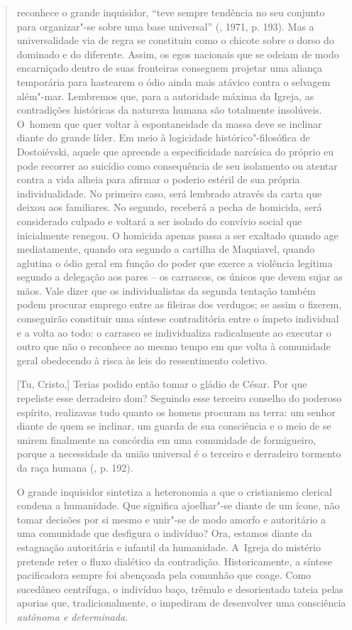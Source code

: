 {\begin{quote}
reconhece o grande inquisidor, ``teve sempre tendência no seu conjunto
para organizar"-se sobre uma base universal'' (, 1971, p.
193). Mas a universalidade via de regra se constituiu como o chicote
sobre o dorso do dominado e do diferente. Assim, os egos nacionais que
se odeiam de modo encarniçado dentro de suas fronteiras conseguem
projetar uma aliança temporária para hastearem o ódio ainda mais atávico
contra o selvagem além"-mar. Lembremos que, para a autoridade máxima da
Igreja, as contradições históricas da natureza humana são totalmente
insolúveis. O~homem que quer voltar à espontaneidade da massa deve se
inclinar diante do grande líder. Em meio à logicidade
histórico"-filosófica de Dostoiévski, aquele que apreende a
especificidade narcísica do próprio eu pode recorrer ao suicídio como
consequência de seu isolamento ou atentar contra a vida alheia para
afirmar o poderio estéril de sua própria individualidade. No primeiro
caso, será lembrado através da carta que deixou aos familiares. No
segundo, receberá a pecha de homicida, será considerado culpado e
voltará a ser isolado do convívio social que inicialmente renegou. O
homicida apenas passa a ser exaltado quando age mediatamente, quando ora
segundo a cartilha de Maquiavel, quando aglutina o ódio geral em função
do poder que exerce a violência legítima segundo a delegação aos pares
-- os carrascos, os únicos que devem sujar as mãos. Vale dizer que os
individualistas da segunda tentação também podem procurar emprego entre
as fileiras dos verdugos; se assim o fizerem, conseguirão constituir uma
síntese contraditória entre o ímpeto individual e a volta ao todo: o
carrasco se individualiza radicalmente ao executar o outro que não o
reconhece ao mesmo tempo em que volta à comunidade geral obedecendo à
risca às leis do ressentimento coletivo.

{[}Tu, Cristo,{]} Terias podido então tomar o gládio de César. Por que
repeliste esse derradeiro dom? Seguindo esse terceiro conselho do
poderoso espírito, realizavas tudo quanto os homens procuram na terra:
um senhor diante de quem se inclinar, um guarda de sua consciência e o
meio de se unirem finalmente na concórdia em uma comunidade de
formigueiro, porque a necessidade da união universal é o terceiro e
derradeiro tormento da raça humana (, p. 192).

O grande inquisidor sintetiza a heteronomia a que o cristianismo
clerical condena a humanidade. Que significa ajoelhar"-se diante de um
ícone, não tomar decisões por si mesmo e unir"-se de modo amorfo e
autoritário a uma comunidade que desfigura o indivíduo? Ora, estamos
diante da estagnação autoritária e infantil da humanidade. A~Igreja do
mistério pretende reter o fluxo dialético da contradição.
Historicamente, a síntese pacificadora sempre foi abençoada pela
comunhão que coage. Como sucedâneo centrífuga, o indivíduo baço, trêmulo
e desorientado tateia pelas aporias que, tradicionalmente, o impediram
de desenvolver uma consciência \emph{autônoma e determinada}.


\end{quote}}
